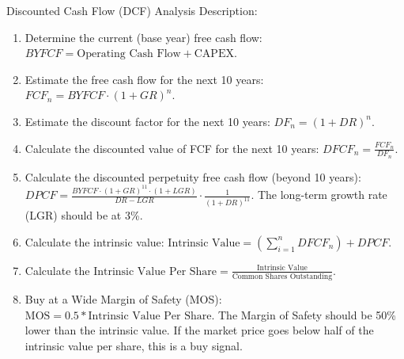 Discounted Cash Flow (DCF) Analysis Description:
\begin{enumerate}
	\item Determine the current (base year) free cash flow: $BYFCF = \text{Operating Cash Flow} + \text{CAPEX}$.
	\item Estimate the free cash flow for the next 10 years: $FCF_n = BYFCF \cdot (1+GR)^n$.
	\item Estimate the discount factor for the next 10 years: $DF_n = (1+DR)^n$.
	\item Calculate the discounted value of FCF for the next 10 years: $DFCF_n = \frac{FCF_n}{DF_n}$.
	\item Calculate the discounted perpetuity free cash flow (beyond 10 years):
	$DPCF = \frac{BYFCF \cdot (1+GR)^{11} \cdot (1+LGR)}{DR-LGR} \cdot \frac{1}{(1+DR)^{11}}$.
	The long-term growth rate (LGR) should be at 3\%.
	\item Calculate the intrinsic value: $\text{Intrinsic Value} = (\sum_{i=1}^n DFCF_n) + DPCF$.
	\item Calculate the $\text{Intrinsic Value Per Share} = \frac{\text{Intrinsic Value}}{\text{Common Shares Outstanding}}$.
    \item Buy at a Wide Margin of Safety (MOS): $\text{MOS} = 0.5 * \text{Intrinsic Value Per Share}$.
        The Margin of Safety should be 50\% lower than the intrinsic value. If 
        the market price goes below half of the intrinsic value per share, this 
        is a buy signal.\\
\end{enumerate}

